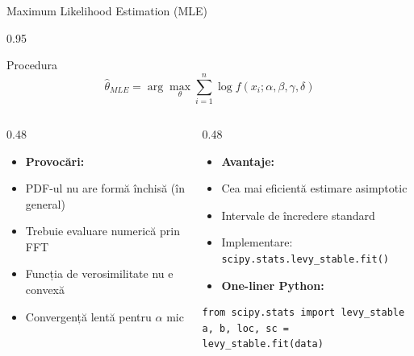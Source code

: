 \documentclass[9pt, aspectratio=169, t]{beamer}
\begin{document}
\begin{frame}[fragile]{Maximum Likelihood Estimation (MLE)}
    \begin{cminipage}{0.95\textwidth}
\begin{block}{Procedura}
\vspace{-0.2cm}
$$\hat{\theta}_{MLE} = \arg\max_{\theta} \sum_{i=1}^{n} \log f(x_i; \alpha, \beta, \gamma, \delta)$$
\vspace{-0.2cm}
\end{block}

\begin{columns}[T]
\begin{column}{0.48\textwidth}
\begin{itemize}\setlength{\itemsep}{0pt}
    \item \textbf{Provocări:}
    \item PDF-ul nu are formă închisă (în general)
    \item Trebuie evaluare numerică prin FFT
    \item Funcția de verosimilitate nu e convexă
    \item Convergență lentă pentru $\alpha$ mic
\end{itemize}
\end{column}
\begin{column}{0.48\textwidth}
\begin{itemize}\setlength{\itemsep}{0pt}
    \item \textbf{Avantaje:}
    \item Cea mai eficientă estimare asimptotic
    \item Intervale de încredere standard
    \item Implementare: \texttt{scipy.stats.levy\_stable.fit()}
\end{itemize}

\vspace{0.1cm}
\begin{itemize}\setlength{\itemsep}{0pt}
    \item \textbf{One-liner Python:}
\end{itemize}
\begin{lstlisting}[basicstyle=\ttfamily\scriptsize]
from scipy.stats import levy_stable
a, b, loc, sc = levy_stable.fit(data)
\end{lstlisting}
\end{column}
\end{columns}
    \end{cminipage}
\end{frame}
\end{document}
